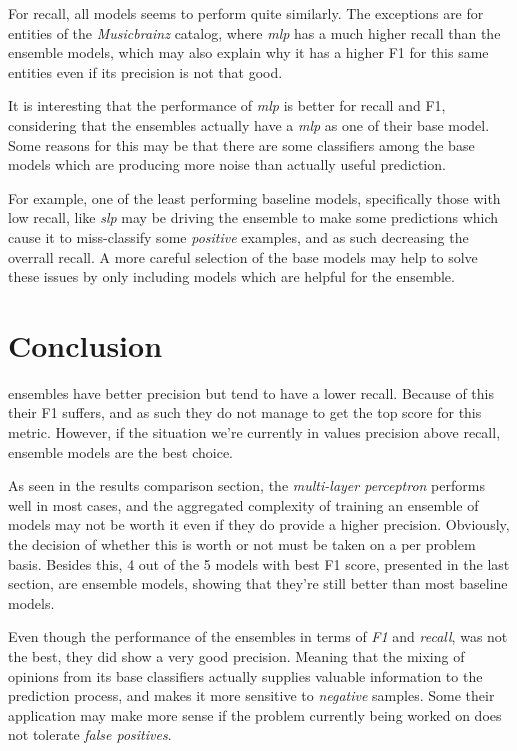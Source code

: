 \documentclass[epsfig,a4paper,11pt,titlepage,twoside,openany]{book}
\begin{document}
For recall, all models seems to perform quite similarly. The exceptions are for entities of the \textit{Musicbrainz} catalog, where \textit{mlp} has a much higher recall than the ensemble models, which may also explain why it has a higher F1 for this same entities even if its precision is not that good.

It is interesting that the performance of \textit{mlp} is better for recall and F1, considering that the ensembles actually have a \textit{mlp} as one of their base model. Some reasons for this may be that there are some classifiers among the base models which are producing more noise than actually useful prediction. 

For example, one of the least performing baseline models, specifically those with low recall, like \textit{slp} may be driving the ensemble to make some predictions which cause it to miss-classify some \textit{positive} examples, and as such decreasing the overrall recall. A more careful selection of the base models may help to solve these issues by only including models which are helpful for the ensemble.


\chapter{Conclusion}
\label{chap:conclusion}


ensembles have better precision but tend to have a lower recall. Because of this their F1 suffers, and as such they do not manage to get the top score for this metric. However, if the situation we're currently in values precision above recall, ensemble models are the best choice.

As seen in the results comparison section, the \textit{multi-layer perceptron} performs well in most cases, and the aggregated complexity of training an ensemble of models may not be worth it even if they do provide a higher precision. Obviously, the decision of whether this is worth or not must be taken on a per problem basis. Besides this, 4 out of the 5 models with best F1 score, presented in the last section, are ensemble models, showing that they're still better than most baseline models.

Even though the performance of the ensembles in terms of \textit{F1} and \textit{recall}, was not the best, they did show a very good precision. Meaning that the mixing of opinions from its base classifiers actually supplies valuable information to the prediction process, and makes it more sensitive to \textit{negative} samples. Some their application may make more sense if the problem currently being worked on does not tolerate \textit{false positives}.
\end{document}
